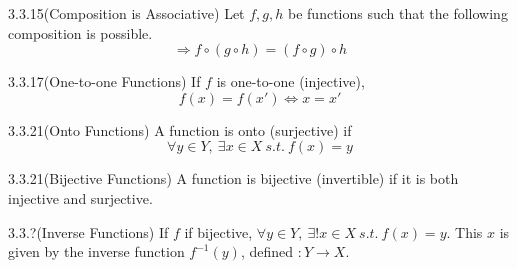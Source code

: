 \documentclass[letterpaper]{article}
\begin{document}
\begin{lebox}{3.3.15}{(Composition is Associative)}
  Let $f,g,h$ be functions such that the following composition is possible.
  \[
    \Rightarrow f \circ (g \circ h) = (f \circ g) \circ h
  \]
\end{lebox}

\begin{defbox}{3.3.17}{(One-to-one Functions)}
  If $f$ is one-to-one (injective), 
  \[
    f(x) = f(x') \iff x = x'
  \]
\end{defbox}

\begin{defbox}{3.3.21}{(Onto Functions)}
  A function is onto (surjective) if
  \[
    \forall y \in Y,~ \exists x \in X ~s.t.~ f(x) = y
  \]
\end{defbox}

\begin{defbox}{3.3.21}{(Bijective Functions)}
  A function is bijective (invertible) if it is both injective and surjective.
\end{defbox}

\begin{defbox}{3.3.?}{(Inverse Functions)}
  If $f$ if bijective, $\forall y \in Y,~ \exists! x \in X ~s.t.~ f(x) = y$. This $x$ is given by the inverse function $f^{-1}(y)$, defined $:Y \to X$.
\end{defbox}
\end{document}
